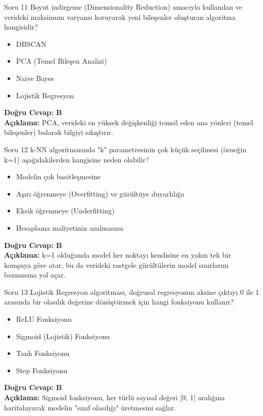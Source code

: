 \documentclass[12pt,a4paper]{article}
\begin{document}
\begin{testcard}{Soru 11}
    Boyut indirgeme (Dimensionality Reduction) amacıyla kullanılan ve verideki maksimum varyansı koruyarak yeni bileşenler oluşturan algoritma hangisidir?
    \begin{itemize}
        \item[A)] DBSCAN
        \item[B)] PCA (Temel Bileşen Analizi)
        \item[C)] Naive Bayes
        \item[D)] Lojistik Regresyon
    \end{itemize}
    \tcblower
    \textbf{Doğru Cevap: B} \\
    \textbf{Açıklama:} PCA, verideki en yüksek değişkenliği temsil eden ana yönleri (temel bileşenler) bularak bilgiyi sıkıştırır.
\end{testcard}

\begin{testcard}{Soru 12}
    k-NN algoritmasında "k" parametresinin çok küçük seçilmesi (örneğin k=1) aşağıdakilerden hangisine neden olabilir?
    \begin{itemize}
        \item[A)] Modelin çok basitleşmesine
        \item[B)] Aşırı öğrenmeye (Overfitting) ve gürültüye duyarlılığa
        \item[C)] Eksik öğrenmeye (Underfitting)
        \item[D)] Hesaplama maliyetinin azalmasına
    \end{itemize}
    \tcblower
    \textbf{Doğru Cevap: B} \\
    \textbf{Açıklama:} k=1 olduğunda model her noktayı kendisine en yakın tek bir komşuya göre atar, bu da verideki rastgele gürültülerin model sınırlarını bozmasına yol açar.
\end{testcard}

\begin{testcard}{Soru 13}
    Lojistik Regresyon algoritması, doğrusal regresyonun aksine çıktıyı 0 ile 1 arasında bir olasılık değerine dönüştürmek için hangi fonksiyonu kullanır?
    \begin{itemize}
        \item[A)] ReLU Fonksiyonu
        \item[B)] Sigmoid (Lojistik) Fonksiyonu
        \item[C)] Tanh Fonksiyonu
        \item[D)] Step Fonksiyonu
    \end{itemize}
    \tcblower
    \textbf{Doğru Cevap: B} \\
    \textbf{Açıklama:} Sigmoid fonksiyonu, her türlü sayısal değeri [0, 1] aralığına haritalayarak modelin "sınıf olasılığı" üretmesini sağlar.
\end{testcard}
\end{document}
